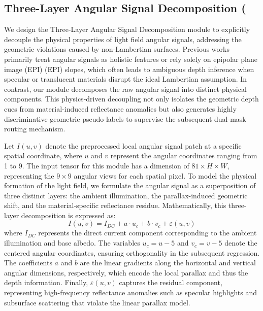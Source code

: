 \subsection{Three-Layer Angular Signal Decomposition (}

We design the Three-Layer Angular Signal Decomposition module to explicitly decouple the physical properties of light field angular signals, addressing the geometric violations caused by non-Lambertian surfaces. Previous works  primarily treat angular signals as holistic features or rely solely on epipolar plane image (EPI) (EPI) slopes, which often leads to ambiguous depth inference when specular or translucent materials disrupt the ideal Lambertian assumption. In contrast, our module decomposes the raw angular signal into distinct physical components. This physics-driven decoupling not only isolates the geometric depth cues from material-induced reflectance anomalies but also generates highly discriminative geometric pseudo-labels to supervise the subsequent dual-mask routing mechanism.

Let $I(u,v)$ denote the preprocessed local angular signal patch at a specific spatial coordinate, where $u$ and $v$ represent the angular coordinates ranging from 1 to 9. The input tensor for this module has a dimension of $81 \times H \times W$, representing the $9 \times 9$ angular views for each spatial pixel. To model the physical formation of the light field, we formulate the angular signal as a superposition of three distinct layers: the ambient illumination, the parallax-induced geometric shift, and the material-specific reflectance residue. Mathematically, this three-layer decomposition is expressed as:
\begin{equation}
\label{eq:eq9}
I(u,v) = I_{DC} + a \cdot u_c + b \cdot v_c + \varepsilon(u,v)
\end{equation}
where $I_{DC}$ represents the direct current component corresponding to the ambient illumination and base albedo. The variables $u_c = u - 5$ and $v_c = v - 5$ denote the centered angular coordinates, ensuring orthogonality in the subsequent regression. The coefficients $a$ and $b$ are the linear gradients along the horizontal and vertical angular dimensions, respectively, which encode the local parallax and thus the depth information. Finally, $\varepsilon(u,v)$ captures the residual component, representing high-frequency reflectance anomalies such as specular highlights and subsurface scattering that violate the linear parallax model.

